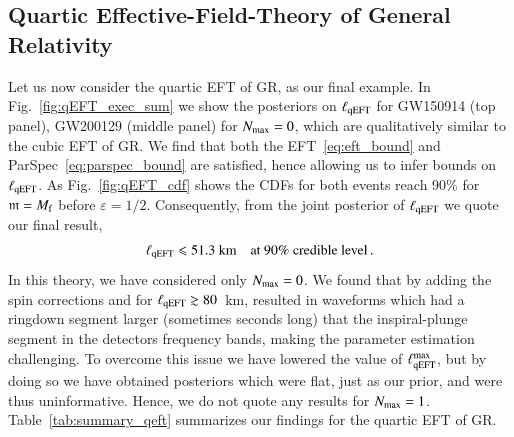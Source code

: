 \documentclass[twocolumn,
               prd,
               aps,
               superscriptaddress,
               tightenlines,
               nofootinbib,
               eqsecnum,
               amsfonts,
               amsmath,
               longbibliography]{revtex4-1}
\newcommand{\gm}{\mathfrak{m}}
\newcommand{\hs}[1]{{\textcolor{TealBlue}{{#1}}}}
\newcommand{\abcomm}[1]{{\textcolor{red}{{[AB: #1]}}}}
\begin{document}
\subsection{Quartic Effective-Field-Theory of General Relativity}
\label{sec:results_qeft}

Let us now consider the quartic EFT of GR, as our final example.
%
In Fig.~\ref{fig:qEFT_exec_sum} we show the posteriors on $\ell_{\rm qEFT}$ for GW150914 (top panel),
GW200129 (middle panel) for $N_{\rm max} = 0$, which are qualitatively similar to the cubic EFT of GR.
%
We find that both the EFT~\eqref{eq:eft_bound} and ParSpec~\eqref{eq:parspec_bound} are satisfied,
hence allowing us to infer bounds on $\ell_{\rm qEFT}$.
%
As Fig.~\ref{fig:qEFT_cdf} shows the CDFs for both events reach 90\% for $\gm = M_{\rm f}$ before $\varepsilon = 1/2$.
%
Consequently, from the joint posterior of $\ell_{\rm qEFT}$ we quote our final result,
%
\begin{equation}
    \ell_{\rm qEFT} \leqslant 51.3~\textrm{km} \quad \textrm{at 90\% credible level}\,.
\end{equation}
%
In this theory, we have considered only $N_{\rm max} = 0$.
%
\hs{We found that by adding the spin corrections and for $\ell_{\rm qEFT} \gtrsim 80$~km, resulted in waveforms which
had a ringdown segment larger (sometimes seconds long) that the inspiral-plunge segment in the detectors frequency bands,
making the parameter estimation challenging.}
%
To overcome this issue we have lowered the value of $\ell^{\rm max}_{\rm qEFT}$, but by doing so we have obtained posteriors
which were flat, just as our prior, and were thus uninformative. Hence, we do not quote any results for $N_{\rm max} = 1$.
%
Table~\ref{tab:summary_qeft} summarizes our findings for the quartic EFT of GR.
%
\end{document}
